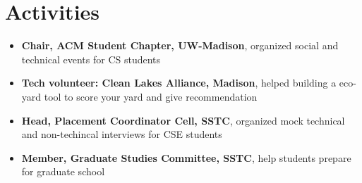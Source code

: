 \documentclass{resume}
\begin{document}
\section{Activities}
\begin{itemize}
  \item \textbf{Chair, ACM Student Chapter, UW-Madison}, organized social and technical events for CS students
  \item \textbf{Tech volunteer: Clean Lakes Alliance, Madison}, helped building a eco-yard tool to score your yard and give recommendation
  \item \textbf{Head, Placement Coordinator Cell, SSTC}, organized mock technical and non-techincal interviews for CSE students
  \item \textbf{Member, Graduate Studies Committee, SSTC}, help students prepare for graduate school
\end{itemize}

%
%
\end{document}
